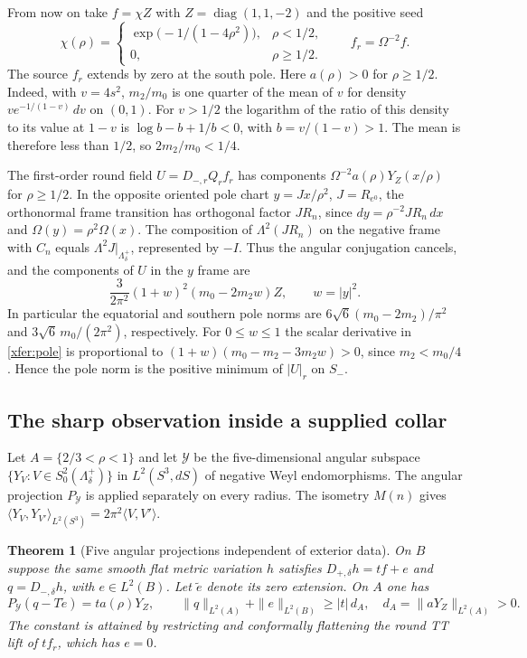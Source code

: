 \documentclass[11pt]{article}
\numberwithin{equation}{section}
\newtheorem{theorem}{Theorem}[section]
\theoremstyle{definition}
\theoremstyle{remark}
\begin{document}
From now on take \(f=\chi Z\) with \(Z=\operatorname{diag}(1,1,-2)\)
and the positive seed
\[
 \chi(\rho)=
 \begin{cases}
 \exp\bigl(-1/(1-4\rho^2)\bigr),&\rho<1/2,\\
 0,&\rho\ge1/2 .
 \end{cases}
 \qquad f_r=\Omega^{-2}f .
\]
The source \(f_r\) extends by zero at the south pole.
Here \(a(\rho)>0\) for \(\rho\ge1/2\). Indeed, with \(v=4s^2\),
\(m_2/m_0\) is one quarter of the mean of \(v\) for density
\(v e^{-1/(1-v)}\,dv\) on \((0,1)\). For \(v>1/2\) the logarithm
of the ratio of this density to its value at \(1-v\) is
\(\log b-b+1/b<0\), with \(b=v/(1-v)>1\). The mean is therefore
less than \(1/2\), so \(2m_2/m_0<1/4\).

The first-order round field \(U=D_{-,r}Q_r f_r\) has components
\(\Omega^{-2}a(\rho)Y_Z(x/\rho)\) for \(\rho\ge1/2\). In the
opposite oriented pole chart \(y=Jx/\rho^2\), \(J=R_{e^0}\), the
orthonormal frame transition has orthogonal factor \(JR_n\),
since \(dy=\rho^{-2}JR_n\,dx\) and \(\Omega(y)=\rho^2\Omega(x)\).
The composition of \(\Lambda^2(JR_n)\) on the negative frame
with \(C_n\) equals \(\Lambda^2J|_{\Lambda_\delta^+}\), represented
by \(-I\). Thus the angular conjugation cancels, and the
components of \(U\) in the \(y\) frame are
\begin{equation}\label{xfer:pole}
 \frac{3}{2\pi^2}(1+w)^2(m_0-2m_2w)Z,\qquad w=|y|^2 .
\end{equation}
In particular the equatorial and southern pole norms are
\(6\sqrt6(m_0-2m_2)/\pi^2\) and \(3\sqrt6\,m_0/(2\pi^2)\),
respectively. For \(0\le w\le1\) the scalar derivative in
\eqref{xfer:pole} is proportional to
\((1+w)(m_0-m_2-3m_2w)>0\), since \(m_2<m_0/4\).
Hence the pole norm is the positive minimum of \(|U|_r\) on \(S_-\).

\subsection{The sharp observation inside a supplied collar}

Let \(A=\{2/3<\rho<1\}\) and let \(\mathcal Y\) be the
five-dimensional angular subspace
\(\{Y_V:V\in S^2_0(\Lambda_\delta^+)\}\) in
\(L^2(S^3,dS)\) of negative Weyl endomorphisms. The angular
projection \(P_{\mathcal Y}\) is applied separately on every radius.
The isometry \(M(n)\) gives
\(\langle Y_V,Y_{V'}\rangle_{L^2(S^3)}=2\pi^2\langle V,V'\rangle\).

\begin{theorem}[Five angular projections independent of exterior data]\label{xfer:sharp}
On \(B\) suppose the same smooth flat metric variation \(h\)
satisfies \(D_{+,\delta}h=tf+e\) and \(q=D_{-,\delta}h\), with
\(e\in L^2(B)\). Let \(\widetilde e\) denote its zero extension.
On \(A\) one has
\begin{equation}\label{xfer:angular}
 P_{\mathcal Y}(q-T\widetilde e)=t a(\rho)Y_Z,\qquad
 \|q\|_{L^2(A)}+\|e\|_{L^2(B)}\ge |t|\,d_A,
 \quad d_A=\|aY_Z\|_{L^2(A)}>0 .
\end{equation}
The constant is attained by restricting and conformally flattening
the round TT lift of \(tf_r\), which has \(e=0\).
\end{theorem}
\end{document}
